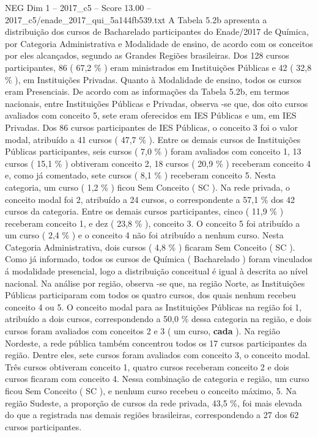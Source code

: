 \begin{textsample}{NEG Dim 1 – 2017\_c5 – Score 13.00 – 2017\_c5/enade\_2017\_qui\_5a144fb539.txt}
A Tabela 5.2b apresenta a distribuição dos cursos de Bacharelado participantes do Enade/2017 de Química, por Categoria Administrativa e Modalidade de ensino, de acordo com os conceitos por eles alcançados, segundo as Grandes Regiões brasileiras.
Dos 128 cursos participantes, 86 ( 67,2 \% ) eram ministrados em Instituições Públicas e 42 ( 32,8 \% ), em Instituições Privadas.
Quanto à Modalidade de ensino, todos os cursos eram Presenciais.
De acordo com as informações da Tabela 5.2b, em termos nacionais, entre Instituições Públicas e Privadas, observa -se que, dos oito cursos avaliados com conceito 5, sete eram oferecidos em IES Públicas e um, em IES Privadas.
Dos 86 cursos participantes de IES Públicas, o conceito 3 foi o valor modal, atribuído a 41 cursos ( 47,7 \% ).
Entre os demais cursos de Instituições Públicas participantes, seis cursos ( 7,0 \% ) foram avaliados com conceito 1, 13 cursos ( 15,1 \% ) obtiveram conceito 2, 18 cursos ( 20,9 \% ) receberam conceito 4 e, como já comentado, sete cursos ( 8,1 \% ) receberam conceito 5.
Nesta categoria, um curso ( 1,2 \% ) ficou Sem Conceito ( SC ).
Na rede privada, o conceito modal foi 2, atribuído a 24 cursos, o correspondente a 57,1 \% dos 42 cursos da categoria.
Entre os demais cursos participantes, cinco ( 11,9 \% ) receberam conceito 1, e dez ( 23,8 \% ), conceito 3.
O conceito 5 foi atribuído a um curso ( 2,4 \% ) e o conceito 4 não foi atribuído a nenhum curso.
Nesta Categoria Administrativa, dois cursos ( 4,8 \% ) ficaram Sem Conceito ( SC ).
Como já informado, todos os cursos de Química ( Bacharelado ) foram vinculados á modalidade presencial, logo a distribuição conceitual é igual à descrita ao nível nacional.
Na análise por região, observa -se que, na região Norte, as Instituições Públicas participaram com todos os quatro cursos, dos quais nenhum recebeu conceito 4 ou 5.
O conceito modal para as Instituições Públicas na região foi 1, atribuído a dois cursos, correspondendo a 50,0 \% dessa categoria na região, e dois cursos foram avaliados com conceitos 2 e 3 ( um curso, \textbf{cada} ).
Na região Nordeste, a rede pública também concentrou todos os 17 cursos participantes da região.
Dentre eles, sete cursos foram avaliados com conceito 3, o conceito modal.
Três cursos obtiveram conceito 1, quatro cursos receberam conceito 2 e dois cursos ficaram com conceito 4.
Nessa combinação de categoria e região, um curso ficou Sem Conceito ( SC ), e nenhum curso recebeu o conceito máximo, 5.
Na região Sudeste, a proporção de cursos da rede privada, 43,5 \%, foi mais elevada do que a registrada nas demais regiões brasileiras, correspondendo a 27 dos 62 cursos participantes.

\end{textsample}
